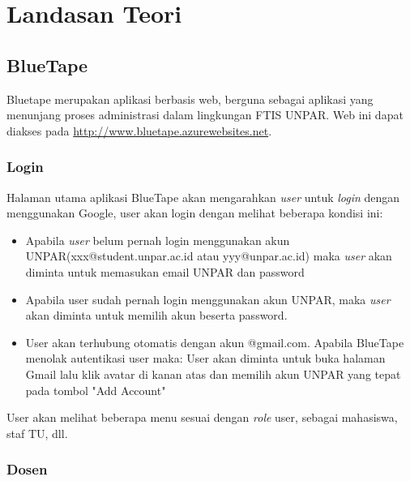 \chapter{Landasan Teori}
\label{chap:teori}

\section{BlueTape}
Bluetape merupakan aplikasi berbasis web, berguna sebagai aplikasi yang menunjang proses administrasi dalam lingkungan FTIS UNPAR. Web ini dapat diakses pada \url{http://www.bluetape.azurewebsites.net}. \cite{blueTape}

\subsection{Login}
Halaman utama aplikasi BlueTape akan mengarahkan \textit{user} untuk \textit{login} dengan menggunakan Google, user akan login dengan melihat beberapa kondisi ini:
\begin{itemize}
\item Apabila \textit{user} belum pernah login menggunakan akun UNPAR(xxx@student.unpar.ac.id atau yyy@unpar.ac.id) maka  \textit{user} akan diminta untuk memasukan email UNPAR dan password
\item Apabila user sudah pernah login menggunakan akun UNPAR, maka \textit{user} akan diminta untuk memilih akun beserta password.
\item User akan terhubung otomatis dengan akun @gmail.com. Apabila BlueTape menolak autentikasi user maka: User akan diminta untuk buka halaman Gmail lalu klik avatar di kanan atas dan memilih akun UNPAR yang tepat pada tombol "Add Account"
\end{itemize}
User akan melihat beberapa menu sesuai dengan \textit{role} user, sebagai mahasiswa, staf TU, dll.

\subsection{Dosen}

